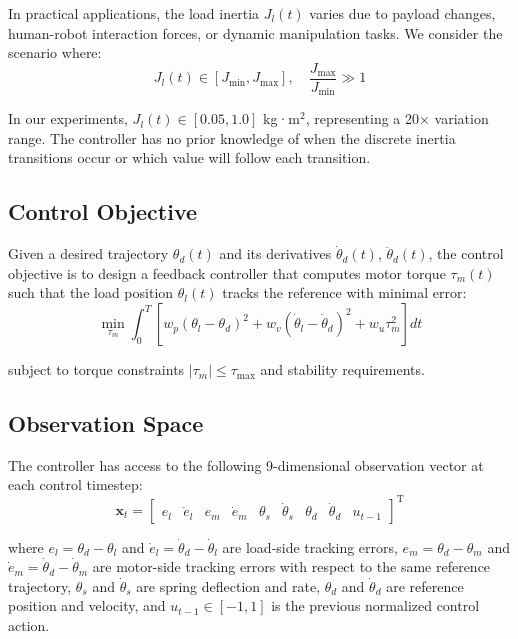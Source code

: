 \documentclass[lettersize,journal]{IEEEtran}
\begin{document}
In practical applications, the load inertia $J_l(t)$ varies due to payload changes, human-robot interaction forces, or dynamic manipulation tasks. We consider the scenario where:
\begin{equation}
J_l(t) \in [J_{\min}, J_{\max}], \quad \frac{J_{\max}}{J_{\min}} \gg 1 \label{eq:inertia_range}
\end{equation}

In our experiments, $J_l(t) \in [0.05, 1.0]$ kg·m$^2$, representing a 20× variation range. The controller has no prior knowledge of when the discrete inertia transitions occur or which value will follow each transition.

\subsection{Control Objective}

Given a desired trajectory $\theta_d(t)$ and its derivatives $\dot{\theta}_d(t)$, $\ddot{\theta}_d(t)$, the control objective is to design a feedback controller that computes motor torque $\tau_m(t)$ such that the load position $\theta_l(t)$ tracks the reference with minimal error:
\begin{equation}
\min_{\tau_m} \int_0^T \left[ w_p(\theta_l - \theta_d)^2 + w_v(\dot{\theta}_l - \dot{\theta}_d)^2 + w_u \tau_m^2 \right] dt \label{eq:objective}
\end{equation}

\noindent subject to torque constraints $|\tau_m| \leq \tau_{\max}$ and stability requirements.

\subsection{Observation Space}

The controller has access to the following 9-dimensional observation vector at each control timestep:
\begin{equation}
\bm{x}_t = \begin{bmatrix}
e_{l} & \dot{e}_{l} & e_{m} & \dot{e}_{m} & \theta_s & \dot{\theta}_s & \theta_d & \dot{\theta}_d & u_{t-1}
\end{bmatrix}^\mathrm{T} \label{eq:observation}
\end{equation}

\noindent where $e_{l} = \theta_d - \theta_l$ and $\dot{e}_{l} = \dot{\theta}_d - \dot{\theta}_l$ are load-side tracking errors, $e_{m} = \theta_d - \theta_m$ and $\dot{e}_{m} = \dot{\theta}_d - \dot{\theta}_m$ are motor-side tracking errors with respect to the same reference trajectory, $\theta_s$ and $\dot{\theta}_s$ are spring deflection and rate, $\theta_d$ and $\dot{\theta}_d$ are reference position and velocity, and $u_{t-1} \in [-1, 1]$ is the previous normalized control action.
\end{document}
